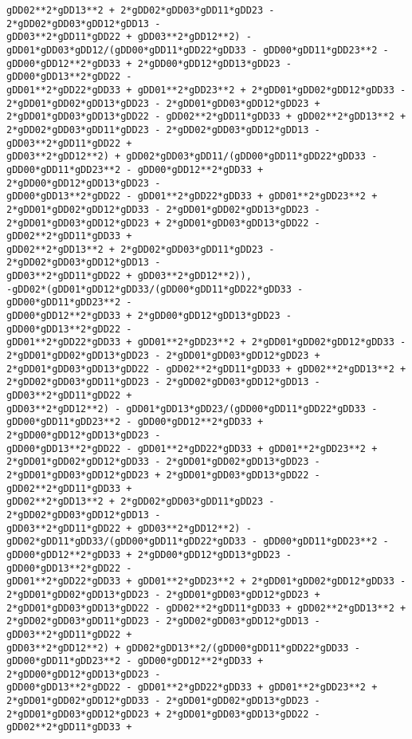 \documentclass[landscape,letterpaper,10pt,english]{article}
\begin{document}
\begin{Verbatim}[commandchars=\\\{\}]
gDD02**2*gDD13**2 + 2*gDD02*gDD03*gDD11*gDD23 - 2*gDD02*gDD03*gDD12*gDD13 -
gDD03**2*gDD11*gDD22 + gDD03**2*gDD12**2) -
gDD01*gDD03*gDD12/(gDD00*gDD11*gDD22*gDD33 - gDD00*gDD11*gDD23**2 -
gDD00*gDD12**2*gDD33 + 2*gDD00*gDD12*gDD13*gDD23 - gDD00*gDD13**2*gDD22 -
gDD01**2*gDD22*gDD33 + gDD01**2*gDD23**2 + 2*gDD01*gDD02*gDD12*gDD33 -
2*gDD01*gDD02*gDD13*gDD23 - 2*gDD01*gDD03*gDD12*gDD23 +
2*gDD01*gDD03*gDD13*gDD22 - gDD02**2*gDD11*gDD33 + gDD02**2*gDD13**2 +
2*gDD02*gDD03*gDD11*gDD23 - 2*gDD02*gDD03*gDD12*gDD13 - gDD03**2*gDD11*gDD22 +
gDD03**2*gDD12**2) + gDD02*gDD03*gDD11/(gDD00*gDD11*gDD22*gDD33 -
gDD00*gDD11*gDD23**2 - gDD00*gDD12**2*gDD33 + 2*gDD00*gDD12*gDD13*gDD23 -
gDD00*gDD13**2*gDD22 - gDD01**2*gDD22*gDD33 + gDD01**2*gDD23**2 +
2*gDD01*gDD02*gDD12*gDD33 - 2*gDD01*gDD02*gDD13*gDD23 -
2*gDD01*gDD03*gDD12*gDD23 + 2*gDD01*gDD03*gDD13*gDD22 - gDD02**2*gDD11*gDD33 +
gDD02**2*gDD13**2 + 2*gDD02*gDD03*gDD11*gDD23 - 2*gDD02*gDD03*gDD12*gDD13 -
gDD03**2*gDD11*gDD22 + gDD03**2*gDD12**2)),
-gDD02*(gDD01*gDD12*gDD33/(gDD00*gDD11*gDD22*gDD33 - gDD00*gDD11*gDD23**2 -
gDD00*gDD12**2*gDD33 + 2*gDD00*gDD12*gDD13*gDD23 - gDD00*gDD13**2*gDD22 -
gDD01**2*gDD22*gDD33 + gDD01**2*gDD23**2 + 2*gDD01*gDD02*gDD12*gDD33 -
2*gDD01*gDD02*gDD13*gDD23 - 2*gDD01*gDD03*gDD12*gDD23 +
2*gDD01*gDD03*gDD13*gDD22 - gDD02**2*gDD11*gDD33 + gDD02**2*gDD13**2 +
2*gDD02*gDD03*gDD11*gDD23 - 2*gDD02*gDD03*gDD12*gDD13 - gDD03**2*gDD11*gDD22 +
gDD03**2*gDD12**2) - gDD01*gDD13*gDD23/(gDD00*gDD11*gDD22*gDD33 -
gDD00*gDD11*gDD23**2 - gDD00*gDD12**2*gDD33 + 2*gDD00*gDD12*gDD13*gDD23 -
gDD00*gDD13**2*gDD22 - gDD01**2*gDD22*gDD33 + gDD01**2*gDD23**2 +
2*gDD01*gDD02*gDD12*gDD33 - 2*gDD01*gDD02*gDD13*gDD23 -
2*gDD01*gDD03*gDD12*gDD23 + 2*gDD01*gDD03*gDD13*gDD22 - gDD02**2*gDD11*gDD33 +
gDD02**2*gDD13**2 + 2*gDD02*gDD03*gDD11*gDD23 - 2*gDD02*gDD03*gDD12*gDD13 -
gDD03**2*gDD11*gDD22 + gDD03**2*gDD12**2) -
gDD02*gDD11*gDD33/(gDD00*gDD11*gDD22*gDD33 - gDD00*gDD11*gDD23**2 -
gDD00*gDD12**2*gDD33 + 2*gDD00*gDD12*gDD13*gDD23 - gDD00*gDD13**2*gDD22 -
gDD01**2*gDD22*gDD33 + gDD01**2*gDD23**2 + 2*gDD01*gDD02*gDD12*gDD33 -
2*gDD01*gDD02*gDD13*gDD23 - 2*gDD01*gDD03*gDD12*gDD23 +
2*gDD01*gDD03*gDD13*gDD22 - gDD02**2*gDD11*gDD33 + gDD02**2*gDD13**2 +
2*gDD02*gDD03*gDD11*gDD23 - 2*gDD02*gDD03*gDD12*gDD13 - gDD03**2*gDD11*gDD22 +
gDD03**2*gDD12**2) + gDD02*gDD13**2/(gDD00*gDD11*gDD22*gDD33 -
gDD00*gDD11*gDD23**2 - gDD00*gDD12**2*gDD33 + 2*gDD00*gDD12*gDD13*gDD23 -
gDD00*gDD13**2*gDD22 - gDD01**2*gDD22*gDD33 + gDD01**2*gDD23**2 +
2*gDD01*gDD02*gDD12*gDD33 - 2*gDD01*gDD02*gDD13*gDD23 -
2*gDD01*gDD03*gDD12*gDD23 + 2*gDD01*gDD03*gDD13*gDD22 - gDD02**2*gDD11*gDD33 +

\end{Verbatim}
\end{document}

